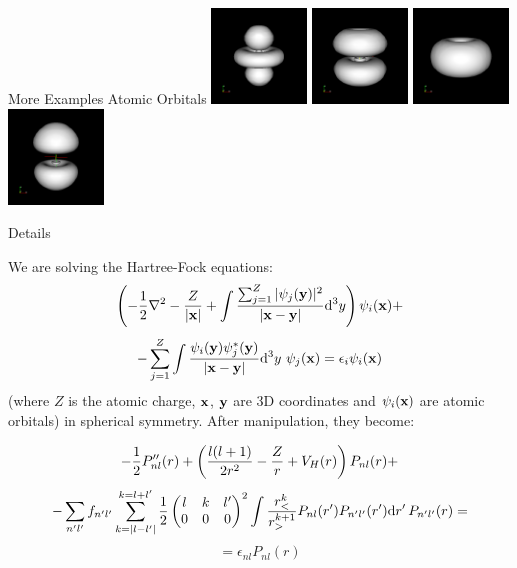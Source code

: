 \documentclass{beamer}
\def\d{{\rm d}}
\begin{document}
\begin{frame}{More Examples Atomic Orbitals}
\includegraphics[width=1in]{../img/orbital_n5l2m0.png}
\includegraphics[width=1in]{../img/orbital_n5l2m1.png}
\includegraphics[width=1in]{../img/orbital_n5l2m2.png}
\includegraphics[width=1in]{../img/orbital_n6l1m0.png}


\end{frame}

\begin{frame}{Details}

We are solving the Hartree-Fock equations:
\[
    \left(-{1\over 2} \nabla^2 -{Z\over |{\bf x}|}
    +
    \int {\sum_{j=1}^Z|\psi_j({\bf y})|^2\over|{\bf x}-{\bf y}|}
            \d^3 y\right)\psi_i({\bf x}) +
\]
\[
    - \sum_{j=1}^Z\int {\psi_i({\bf y})\psi_j^*({\bf y})\over|{\bf x}-{\bf y}|}
            \d^3 y\,\,\psi_j({\bf x})
    =
    \epsilon_i \psi_i({\bf x})
\]
(where $Z$ is the atomic charge, ${\bf x}$, ${\bf y}$ are 3D coordinates and
$\psi_i({\bf x})$ are atomic orbitals) in spherical symmetry. After
manipulation, they become:

\[
    -{1\over2} P_{nl}''(r) +
        \left({l(l+1)\over 2r^2} -{Z\over r} + V_H(r)\right)P_{nl}(r) +
\]
\[
            -\sum_{n'l'}
                f_{n'l'}
                \sum_{k=|l-l'|}^{k=l+l'}
                {1\over2}\begin{pmatrix} l & k & l' \\ 0 & 0 & 0 \end{pmatrix}^2
                \int
                {r_{<}^k\over r_{>}^{k+1}}
                P_{nl}(r')
                P_{n'l'}(r')
                \d r'\,
                    P_{n'l'}(r)
        =
\]
\[
        = \epsilon_{nl} P_{nl}(r)
\]


\end{frame}
\end{document}
